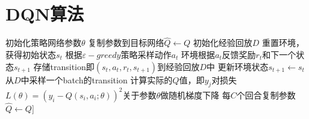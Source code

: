 \documentclass[11pt]{ctexart}
\begin{document}
\section{DQN算法}
\begin{algorithm}[H] %
    \renewcommand{\thealgorithm}{} %
	\caption{} 
    \renewcommand{\algorithmicrequire}{\textbf{输入:}}  
    \renewcommand{\algorithmicensure}{\textbf{输出:}} 
	\begin{algorithmic}[1]
		\STATE 初始化策略网络参数$\theta$ %
		\STATE 复制参数到目标网络$\hat{Q} \leftarrow Q$
		\STATE 初始化经验回放$D$
			\STATE 重置环境，获得初始状态$s_t$
				\STATE 根据$\varepsilon-greedy$策略采样动作$a_t$
				\STATE 环境根据$a_t$反馈奖励$r_t$和下一个状态$s_{t+1}$
				\STATE 存储transition即$(s_t,a_t,r_t,s_{t+1})$到经验回放$D$中
				\STATE 更新环境状态$s_{t+1} \leftarrow s_t$
				\STATE 从$D$中采样一个batch的transition
				\STATE 计算实际的$Q$值，即$y_{j}$\footnotemark[2]
				\STATE 对损失 $L(\theta)=\left(y_{i}-Q\left(s_{i}, a_{i} ; \theta\right)\right)^{2}$关于参数$\theta$做随机梯度下降\footnotemark[3]
			\ENDFOR
			\STATE 每$C$个回合复制参数$\hat{Q}\leftarrow Q$\footnotemark[4]]
		\ENDFOR
	\end{algorithmic}
\end{algorithm}
\clearpage
\end{document}
